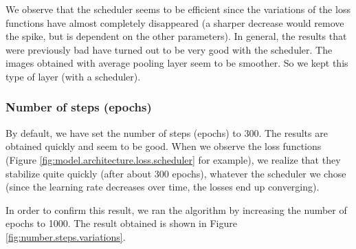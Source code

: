 \documentclass[twocolumn,superscriptaddress,aps,floatfix, nofootinbib]{revtex4-1}
\begin{document}
    We observe that the scheduler seems to be efficient since the variations of the loss functions have almost completely disappeared (a sharper decrease would remove the spike, but is dependent on the other parameters). In general, the results that were previously bad have turned out to be very good with the scheduler. The images obtained with average pooling layer seem to be smoother. So we kept this type of layer (with a scheduler).
    
    \subsubsection{Number of steps (epochs)}
    
    By default, we have set the number of steps (epochs) to 300. The results are obtained quickly and seem to be good. When we observe the loss functions (Figure \ref{fig:model.architecture.loss.scheduler} for example), we realize that they stabilize quite quickly (after about 300 epochs), whatever the scheduler we chose (since the learning rate decreases over time, the losses end up converging).
    
    In order to confirm this result, we ran the algorithm by increasing the number of epochs to 1000. The result obtained is shown in Figure \ref{fig:number.steps.variations}.
    
\end{document}
